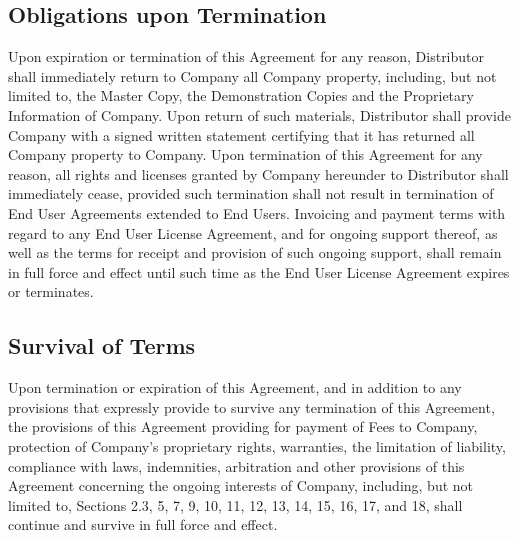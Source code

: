 \documentclass[letterpaper,10pt,english]{sphinxmanual}
\begin{document}
\subsection{Obligations upon Termination}
\label{\detokenize{terminiation:obligations-upon-termination}}
Upon expiration or termination of this Agreement for any reason, Distributor shall immediately return to Company all Company property, including, but not limited to, the Master Copy, the Demonstration Copies and the Proprietary Information of Company. Upon return of such materials, Distributor shall provide Company with a signed written statement certifying that it has returned all Company property to Company. Upon termination of this Agreement for any reason, all rights and licenses granted by Company hereunder to Distributor shall immediately cease, provided such termination shall not result in termination of End User Agreements extended to End Users. Invoicing and payment terms with regard to any End User License Agreement, and for ongoing support thereof, as well as the terms for receipt and provision of such ongoing support, shall remain in full force and effect until such time as the End User License Agreement expires or terminates.


\subsection{Survival of Terms}
\label{\detokenize{terminiation:survival-of-terms}}
Upon termination or expiration of this Agreement, and in addition to any provisions that expressly provide to survive any termination of this Agreement, the provisions of this Agreement providing for payment of Fees to Company, protection of Company’s proprietary rights, warranties, the limitation of liability, compliance with laws, indemnities, arbitration and other provisions of this Agreement concerning the ongoing interests of Company, including, but not limited to, Sections 2.3, 5, 7, 9, 10, 11, 12, 13, 14, 15, 16, 17, and 18, shall continue and survive in full force and effect.
\end{document}
